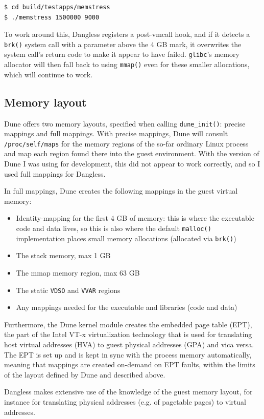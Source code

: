 \begin{verbatim}
$ cd build/testapps/memstress
$ ./memstress 1500000 9000
\end{verbatim}

To work around this, Dangless registers a post-vmcall hook, and if it detects a \lstinline!brk()! system call with a parameter above the 4 GB mark, it overwrites the system call's return code to make it appear to have failed. \texttt{glibc}'s memory allocator will then fall back to using \lstinline!mmap()! even for these smaller allocations, which will continue to work.

\subsection{Memory layout}

Dune offers two memory layouts, specified when calling \lstinline!dune_init()!: precise mappings and full mappings.
With precise mappings, Dune will consult \texttt{/proc/self/maps} for the memory regions of the so-far ordinary Linux process and map each region found there into the guest environment. With the version of Dune I was using for development, this did not appear to work correctly, and so I used full mappings for Dangless.

In full mappings, Dune creates the following mappings in the guest virtual memory:

\begin{itemize}
	\item Identity-mapping for the first 4 GB of memory: this is where the executable code and data lives, so this is also where the default \lstinline!malloc()! implementation places small memory allocations (allocated via \lstinline!brk()!)
	\item The stack memory, max 1 GB
	\item The mmap memory region, max 63 GB
	\item The static \texttt{VDSO} and \texttt{VVAR} regions
	\item Any mappings needed for the executable and libraries (code and data)
\end{itemize}

Furthermore, the Dune kernel module creates the embedded page table (EPT), the part of the Intel VT-x virtualization technology that is used for translating host virtual addresses (HVA) to guest physical addresses (GPA) and vica versa. The EPT is set up and is kept in sync with the process memory automatically, meaning that mappings are created on-demand on EPT faults, within the limits of the layout defined by Dune and described above.

Dangless makes extensive use of the knowledge of the guest memory layout, for instance for translating physical addresses (e.g. of pagetable pages) to virtual addresses.
